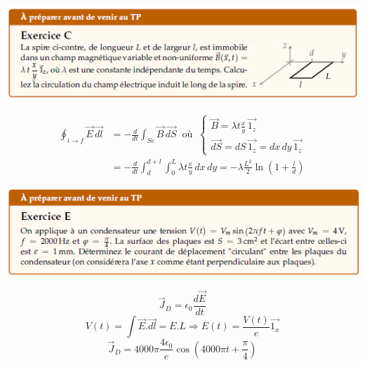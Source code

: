 \documentclass	[11pt, a4paper, openany]{book}
\begin{document}
			\newpage
			\begin{center}
			\includegraphics[scale=1]{prepa/exoC.png}\\
			\end{center}
			\begin{align*}\oint_{i\rightarrow f}\vec{E}\,\vec{dl} & =-\frac{d}{dt}\int_{Sc}\vec B\,\vec{dS}\ \text{ où }\ \left\{\begin{array}{l}
			\vec B=\lambda t\frac{x}{y}\,\vec{1_z}\\
			\vec{dS}=dS\,\vec{1_z}=dx\,dy\,\vec{1_z}\end{array}\right.\\
			& =-\frac{d}{dt}\int_d^{d+l}\int_0^L\lambda t\frac{x}{y}\,dx\,dy=-\lambda\frac{L^2}{2}\ln\left(1+\frac{l}{d}\right)\end{align*}
			
			
			\begin{center}
			\includegraphics[scale=1]{prepa/exoE.png}\\
			\end{center}
			$$\vec{J}_D = \epsilon_0 \frac{d\vec{E}}{dt}$$
			$$V(t) = \int \vec{E}.\vec{dl} = E.L \Rightarrow E(t) = \frac{V(t)}{e}\vec{1_x}$$
			$$\vec{J}_D = 4000\pi \frac{4 \epsilon_0}{e} \cos\left(4000\pi t + \frac{\pi}{4}\right)$$
			
\end{document}
